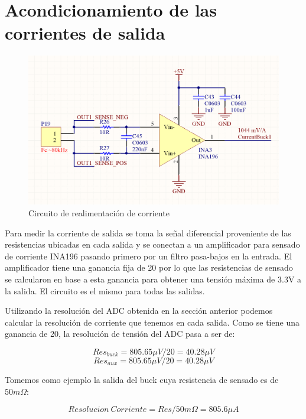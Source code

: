 \documentclass[12pt]{report}
\begin{document}
\section{Acondicionamiento de las corrientes de salida}

\begin{figure}[H]
	\centering
	\includegraphics[width=\textwidth,height=\textheight,keepaspectratio]{current_feedback}
	\caption{Circuito de realimentación de corriente}
\end{figure}

Para medir la corriente de salida se toma la señal diferencial proveniente de las resistencias ubicadas en cada salida y se conectan a un amplificador para sensado de corriente INA196 pasando primero por un filtro pasa-bajos en la entrada. El amplificador tiene una ganancia fija de 20 por lo que las resistencias de sensado se calcularon en base a esta ganancia para obtener una tensión máxima de 3.3V a la salida. El circuito es el mismo para todas las salidas.

Utilizando la resolución del ADC obtenida en la sección anterior podemos calcular la resolución de corriente que tenemos en cada salida. Como se tiene una ganancia de 20, la resolución de tensión del ADC pasa a ser de:

\begin{equation}
	Res_{buck} = 805.65 \mu V / 20 = 40.28\mu V
\end{equation}
\begin{equation}
	Res_{aux} = 805.65 \mu V / 20 = 40.28 \mu V
\end{equation}

Tomemos como ejemplo la salida del buck cuya resistencia de sensado es de $50m\Omega$:

\begin{equation}
	Resolucion \ Corriente = Res / 50m\Omega = 805.6 \mu A
\end{equation}
\end{document}

